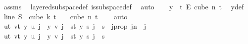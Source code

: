 \begin{isabellebody}
\ assms{\isacharparenleft}{\kern0pt}{}{\isacharparenright}{\kern0pt}\ \isamarkupfalse%
\ layered{\isacharunderscore}{\kern0pt}subspace{\isacharunderscore}{\kern0pt}def\ is{\isacharunderscore}{\kern0pt}subspace{\isacharunderscore}{\kern0pt}def\ \isamarkupfalse%
\ auto\isanewline
\isanewline
\ \ \isamarkupfalse%
\ {\isachardoublequoteopen}y\ {\isasymin}\ {\isacharbraceleft}{\kern0pt}{\isachardot}{\kern0pt}{\isachardot}{\kern0pt}{\isacharless}{\kern0pt}t{\isacharplus}{\kern0pt}{}{\isacharbraceright}{\kern0pt}\ {\isasymrightarrow}\isactrlsub E\ cube\ n\ {\isacharparenleft}{\kern0pt}t{\isacharplus}{\kern0pt}{}{\isacharparenright}{\kern0pt}{\isachardoublequoteclose}\ \isamarkupfalse%
\ y{\isacharunderscore}{\kern0pt}def\ \isamarkupfalse%
\ line{}\ {\isacartoucheopen}S\ {\isacharbackquote}{\kern0pt}\ cube\ k\ {\isacharparenleft}{\kern0pt}t\ {\isacharplus}{\kern0pt}\ {}{\isacharparenright}{\kern0pt}\ {\isasymsubseteq}\ cube\ n\ {\isacharparenleft}{\kern0pt}t\ {\isacharplus}{\kern0pt}\ {}{\isacharparenright}{\kern0pt}{\isacartoucheclose}\ \isamarkupfalse%
\ auto\isanewline
\ \ \isamarkupfalse%
\ \isamarkupfalse%
\ {\isachardoublequoteopen}{\isacharparenleft}{\kern0pt}{\isasymforall}u{\isacharless}{\kern0pt}t{\isacharplus}{\kern0pt}{}{\isachardot}{\kern0pt}\ {\isasymforall}v{\isacharless}{\kern0pt}t{\isacharplus}{\kern0pt}{}{\isachardot}{\kern0pt}\ y\ u\ j\ {\isacharequal}{\kern0pt}\ y\ v\ j{\isacharparenright}{\kern0pt}\ {\isasymor}\ {\isacharparenleft}{\kern0pt}{\isasymforall}s{\isacharless}{\kern0pt}t{\isacharplus}{\kern0pt}{}{\isachardot}{\kern0pt}\ y\ s\ j\ {\isacharequal}{\kern0pt}\ s{\isacharparenright}{\kern0pt}{\isachardoublequoteclose}\ \ j{\isacharunderscore}{\kern0pt}prop{\isacharcolon}{\kern0pt}\ {\isachardoublequoteopen}j{\isacharless}{\kern0pt}n{\isachardoublequoteclose}\ \ j\ \isanewline
\ \ \isamarkupfalse%
{\isacharminus}{\kern0pt}\isanewline
\ \ \ \ \isamarkupfalse%
\ {\isachardoublequoteopen}{\isacharparenleft}{\kern0pt}{\isasymforall}u{\isacharless}{\kern0pt}t{\isacharplus}{\kern0pt}{}{\isachardot}{\kern0pt}\ {\isasymforall}v{\isacharless}{\kern0pt}t{\isacharplus}{\kern0pt}{}{\isachardot}{\kern0pt}\ y\ u\ j\ {\isacharequal}{\kern0pt}\ y\ v\ j{\isacharparenright}{\kern0pt}\ {\isasymor}\ {\isacharparenleft}{\kern0pt}{\isasymforall}s{\isacharless}{\kern0pt}t{\isacharplus}{\kern0pt}{}{\isachardot}{\kern0pt}\ y\ s\ j\ {\isacharequal}{\kern0pt}\ s{\isacharparenright}{\kern0pt}{\isachardoublequoteclose}\isanewline

\end{isabellebody}
